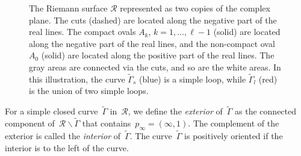\documentclass[11pt]{article}
\theoremstyle{plain}
\theoremstyle{definition}
\numberwithin{equation}{section}
\begin{document}
\begin{figure}[t]
\begin{center}
 \end{center}
  \caption{The Riemann surface $\mathcal R$ represented as two copies of the complex plane. The cuts (dashed) are located along the negative part of the real lines. The compact ovals $A_k$, $k=1,\dots,\ell-1$ (solid) are located along the negative part of the real lines, and the non-compact oval $A_0$ (solid) are located along the positive part of the real lines. The gray areas are connected via the cuts, and so are the white areas. In this illustration, the curve $\tilde \Gamma_s$ (blue) is a simple loop, while $\tilde \Gamma_l$ (red) is the union of two simple loops.\label{fig:rs_sheets}}
\end{figure}


For a simple closed curve~$\tilde \Gamma$ in~$\mathcal R$, we define the \emph{exterior} of~$\tilde \Gamma$ as the connected component of~$\mathcal R\backslash \tilde \Gamma$ that contains~$p_\infty=(\infty,1)$. The complement of the exterior is called the \emph{interior} of~$\tilde \Gamma$. The curve~$\tilde \Gamma$ is positively oriented if the interior is to the left of the curve. 
\end{document}
